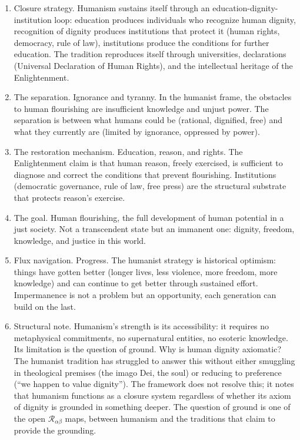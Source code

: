 \documentclass[
]{article}
\providecommand{\tightlist}{%
  \setlength{\itemsep}{0pt}\setlength{\parskip}{0pt}}
\begin{document}
\begin{enumerate}
\def\labelenumi{\arabic{enumi}.}
\setcounter{enumi}{105}
\tightlist
\item
  Closure strategy. Humanism sustains itself through an
  education-dignity-institution loop: education produces individuals who
  recognize human dignity, recognition of dignity produces institutions
  that protect it (human rights, democracy, rule of law), institutions
  produce the conditions for further education. The tradition reproduces
  itself through universities, declarations (Universal Declaration of
  Human Rights), and the intellectual heritage of the Enlightenment.
\item
  The separation. Ignorance and tyranny. In the humanist frame, the
  obstacles to human flourishing are insufficient knowledge and unjust
  power. The separation is between what humans could be (rational,
  dignified, free) and what they currently are (limited by ignorance,
  oppressed by power).
\item
  The restoration mechanism. Education, reason, and rights. The
  Enlightenment claim is that human reason, freely exercised, is
  sufficient to diagnose and correct the conditions that prevent
  flourishing. Institutions (democratic governance, rule of law, free
  press) are the structural substrate that protects reason's exercise.
\item
  The goal. Human flourishing, the full development of human potential
  in a just society. Not a transcendent state but an immanent one:
  dignity, freedom, knowledge, and justice in this world.
\item
  Flux navigation. Progress. The humanist strategy is historical
  optimism: things have gotten better (longer lives, less violence, more
  freedom, more knowledge) and can continue to get better through
  sustained effort. Impermanence is not a problem but an opportunity,
  each generation can build on the last.
\item
  Structural note. Humanism's strength is its accessibility: it requires
  no metaphysical commitments, no supernatural entities, no esoteric
  knowledge. Its limitation is the question of ground. Why is human
  dignity axiomatic? The humanist tradition has struggled to answer this
  without either smuggling in theological premises (the imago Dei, the
  soul) or reducing to preference (``we happen to value dignity''). The
  framework does not resolve this; it notes that humanism functions as a
  closure system regardless of whether its axiom of dignity is grounded
  in something deeper. The question of ground is one of the open
  \(\mathcal{R}_{\alpha\beta}\) maps, between humanism and the
  traditions that claim to provide the grounding.
\end{enumerate}
\end{document}
